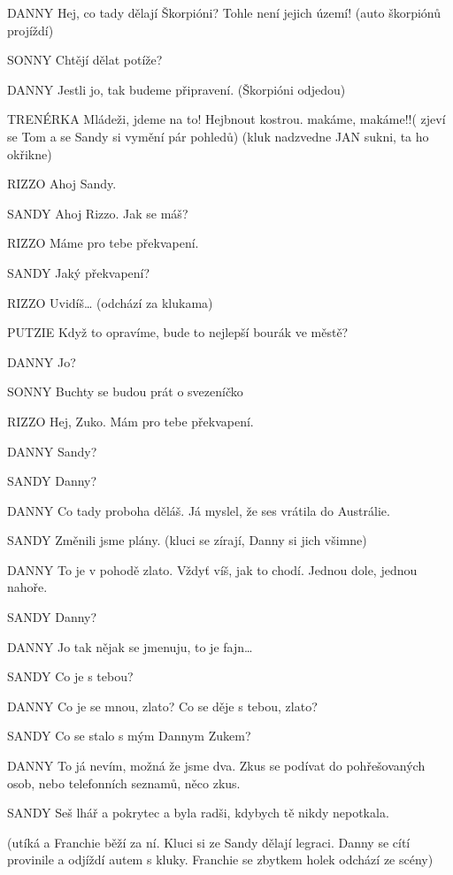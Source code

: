 DANNY        Hej, co tady dělají Škorpióni? Tohle není jejich území! (auto škorpiónů         projíždí)

SONNY          Chtějí dělat potíže?

DANNY         Jestli jo, tak budeme připravení. (Škorpióni odjedou)

TRENÉRKA        Mládeži, jdeme na to! Hejbnout kostrou. makáme, makáme!!( zjeví se Tom a se Sandy si vymění pár pohledů)  (kluk nadzvedne JAN sukni, ta ho okřikne)

RIZZO        Ahoj Sandy.

SANDY        Ahoj Rizzo. Jak se máš?

RIZZO        Máme pro tebe překvapení.

SANDY        Jaký překvapení?

RIZZO        Uvidíš…    (odchází za klukama)

PUTZIE        Když to opravíme, bude to nejlepší bourák ve městě?

DANNY        Jo?

SONNY        Buchty se budou prát o svezeníčko

RIZZO        Hej, Zuko. Mám pro tebe překvapení.

DANNY        Sandy?

SANDY        Danny?

DANNY        Co tady proboha děláš. Já myslel, že ses vrátila do Austrálie. 

SANDY        Změnili jsme plány. (kluci se zírají, Danny si jich všimne)

DANNY        To je v pohodě zlato. Vždyť víš, jak to chodí. Jednou dole, jednou nahoře. 

SANDY        Danny?

DANNY        Jo tak nějak se jmenuju, to je fajn…

SANDY        Co je s tebou?

DANNY        Co je se mnou, zlato? Co se děje s tebou, zlato?

SANDY        Co se stalo s mým Dannym Zukem?

DANNY        To já nevím, možná že jsme dva. Zkus se podívat do pohřešovaných                 osob, nebo telefonních seznamů, něco zkus.

SANDY        Seš lhář a pokrytec a byla radši, kdybych tě nikdy nepotkala.

        (utíká a Franchie běží za ní. Kluci si ze Sandy dělají legraci. Danny se cítí         provinile a odjíždí autem s kluky. Franchie se zbytkem holek odchází ze scény) 

